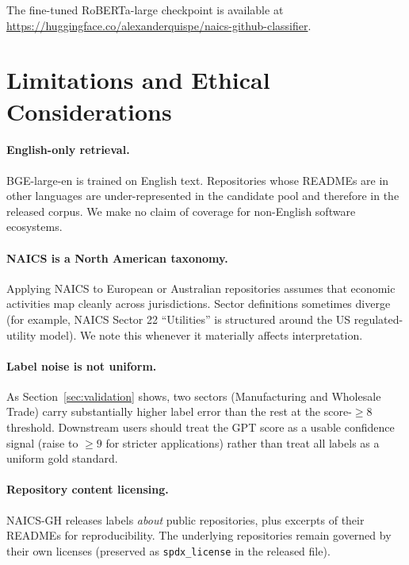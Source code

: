 \documentclass{article}
\begin{document}
The fine-tuned RoBERTa-large checkpoint is available at
\url{https://huggingface.co/alexanderquispe/naics-github-classifier}.

\section{Limitations and Ethical Considerations}
\label{sec:limitations}

\paragraph{English-only retrieval.} BGE-large-en is trained on English
text. Repositories whose READMEs are in other languages are
under-represented in the candidate pool and therefore in the released
corpus. We make no claim of coverage for non-English software ecosystems.

\paragraph{NAICS is a North American taxonomy.} Applying NAICS to
European or Australian repositories assumes that economic activities
map cleanly across jurisdictions. Sector definitions sometimes diverge
(for example, NAICS Sector 22 ``Utilities'' is structured around the
US regulated-utility model). We note this whenever it materially affects
interpretation.

\paragraph{Label noise is not uniform.} As Section~\ref{sec:validation}
shows, two sectors (Manufacturing and Wholesale Trade) carry
substantially higher label error than the rest at the score-$\geq 8$
threshold. Downstream users should treat the GPT score as a usable
confidence signal (raise to $\geq 9$ for stricter applications)
rather than treat all labels as a uniform gold standard.

\paragraph{Repository content licensing.} NAICS-GH releases labels
\emph{about} public repositories, plus excerpts of their READMEs for
reproducibility. The underlying repositories remain governed by their
own licenses (preserved as \texttt{spdx\_license} in the released file).
\end{document}
